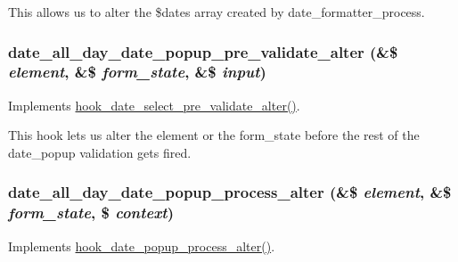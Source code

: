 This allows us to alter the \$dates array created by date\_\-formatter\_\-process. \hypertarget{date__all__day_8module_a4138a46a5760b72f5bc35574629b1aa8}{
\subsubsection[{date\_\-all\_\-day\_\-date\_\-popup\_\-pre\_\-validate\_\-alter}]{\setlength{\rightskip}{0pt plus 5cm}date\_\-all\_\-day\_\-date\_\-popup\_\-pre\_\-validate\_\-alter (\&\$ {\em element}, \/  \&\$ {\em form\_\-state}, \/  \&\$ {\em input})}}
\label{date__all__day_8module_a4138a46a5760b72f5bc35574629b1aa8}
Implements \hyperlink{date_8api_8php_a8fa3364916ca73163501f3b9fa319dd6}{hook\_\-date\_\-select\_\-pre\_\-validate\_\-alter()}.

This hook lets us alter the element or the form\_\-state before the rest of the date\_\-popup validation gets fired. \hypertarget{date__all__day_8module_a2abea20ffe8ef05e518da5cf1f7b3b9f}{
\subsubsection[{date\_\-all\_\-day\_\-date\_\-popup\_\-process\_\-alter}]{\setlength{\rightskip}{0pt plus 5cm}date\_\-all\_\-day\_\-date\_\-popup\_\-process\_\-alter (\&\$ {\em element}, \/  \&\$ {\em form\_\-state}, \/  \$ {\em context})}}
\label{date__all__day_8module_a2abea20ffe8ef05e518da5cf1f7b3b9f}
Implements \hyperlink{date_8api_8php_a8b0b96439de62930ff766eb159d044cb}{hook\_\-date\_\-popup\_\-process\_\-alter()}.

